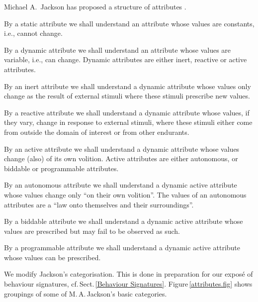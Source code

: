

\begynd
\pind Michael A.\ Jackson has proposed a structure of attributes \cite{lexicon}.
\afslut

\begynd
\pind By a static attribute we shall understand an attribute whose values are constants, i.e., cannot change.
\afslut

\begynd
\pind By a dynamic attribute we shall understand an attribute whose values are variable, i.e., can change. 
\pind Dynamic attributes are either inert, reactive or active attributes.
\afslut

\begynd
\pind By an inert attribute we shall understand a dynamic attribute
      whose values only change as the result of external stimuli where 
      these stimuli prescribe new values.   
\afslut

\begynd
\pind By a reactive attribute we shall
      understand a dynamic attribute whose values, if they vary, change in response to external
      stimuli, where these stimuli either come from outside the domain of interest or from other
      endurants.
\afslut

\begynd
\pind By an active attribute we shall understand a dynamic attribute
whose values change (also) of its own volition.  
\pind Active attributes
      are either autonomous, or  biddable or programmable attributes.
\afslut

\begynd
\pind By an autonomous attribute we
      shall understand a dynamic active attribute whose values change
      only ``on their own volition''. 
\pind The values of an autonomous attributes are a ``law onto
      themselves and their surroundings''.
\afslut

\begynd
\pind By a  biddable attribute we shall understand a dynamic active
      attribute whose values are prescribed but may fail to be observed as such.
\afslut

\begynd
\pind  By a  programmable attribute we shall understand a dynamic active attribute whose values can be prescribed.
\afslut

\begynd
\pind We modify Jackson's categorisation.
\pind This is done in preparation for our expos{\'e} of behaviour
      signatures, cf.\,Sect.\,\vref{Behaviour Signatures}.
\pind Figure\,\vref{attributes.fig} shows groupings of some  of M.\,A.\,Jackson's  basic categories.
\afslut

